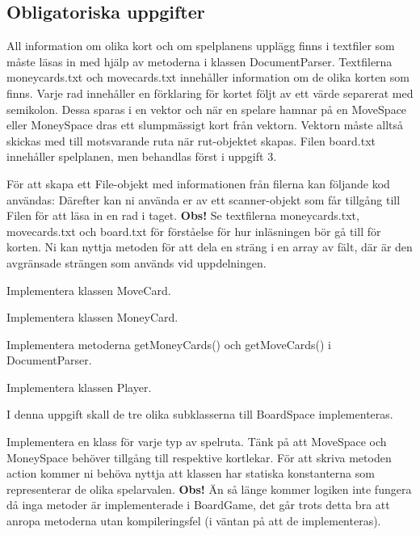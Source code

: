 \subsection{Obligatoriska uppgifter}

\Task All information om olika kort och om spelplanens upplägg finns i textfiler som måste läsas in med hjälp av metoderna i klassen DocumentParser. 
Textfilerna moneycards.txt och movecards.txt innehåller information om de olika korten som finns.
Varje rad innehåller en förklaring för kortet följt av ett värde separerat med semikolon. Dessa sparas i en vektor och när en spelare hamnar på en MoveSpace eller MoneySpace dras ett slumpmässigt kort från vektorn. Vektorn måste alltså skickas med till motsvarande ruta när rut-objektet skapas.
Filen board.txt innehåller spelplanen, men behandlas först i uppgift 3.

För att skapa ett File-objekt med informationen från filerna kan följande kod användas:
\newline
\newline
{}
\newline
{}
\newline
\newline
Därefter kan ni använda er av ett scanner-objekt som får tillgång till Filen för att läsa in en rad i taget.
\noindent
\newline
\textbf{Obs!} Se textfilerna moneycards.txt, movecards.txt och board.txt för förståelse för hur inläsningen bör gå till för korten. \newline Ni kan nyttja metoden  för att dela en sträng i en array av fält, där  är den avgränsade strängen som används vid uppdelningen.

\Subtask Implementera klassen MoveCard.

\Subtask Implementera klassen MoneyCard.

\Subtask Implementera metoderna getMoneyCards() och getMoveCards() i DocumentParser.

\Subtask Implementera klassen Player.

\Task I denna uppgift skall de tre olika subklasserna till BoardSpace implementeras.

\Subtask Implementera en klass för varje typ av spelruta. Tänk på att MoveSpace och MoneySpace behöver tillgång till respektive kortlekar.
För att skriva metoden action kommer ni behöva nyttja att klassen  har statiska konstanterna som representerar de olika spelarvalen.
\newline
\newline
\noindent
\textbf{Obs!} Än så länge kommer logiken inte fungera då inga metoder är implementerade i BoardGame, det går trots detta bra att anropa metoderna utan kompileringsfel (i väntan på att de implementeras).



